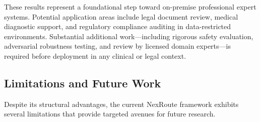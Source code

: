 \documentclass[a4paper,fleql]{cas-sc}
\begin{document}
These results represent a foundational step toward on-premise professional
expert systems. Potential application areas include legal document review,
medical diagnostic support, and regulatory compliance auditing in
data-restricted environments. Substantial additional work---including rigorous
safety evaluation, adversarial robustness testing, and review by licensed
domain experts---is required before deployment in any clinical or legal
context.

\subsection{Limitations and Future Work}
\label{sec:limitations}
Despite its structural advantages, the current NexRoute framework exhibits
several limitations that provide targeted avenues for future research.
\end{document}
